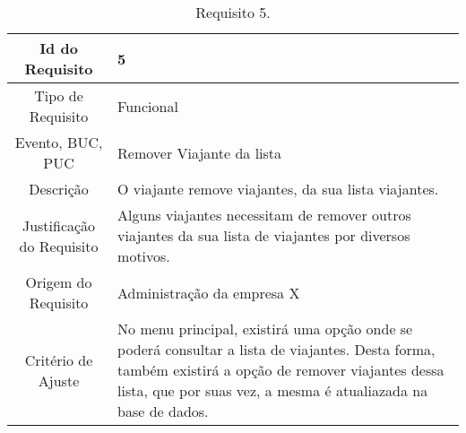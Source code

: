 \begin{table}[H]
\begin{center}
  \begin{tabularx}{\textwidth}{ | c | X | }
    \hline
    Id do Requisito & 5  \\
    
    \hline
    Tipo de Requisito & Funcional \\
    
    \hline
    Evento, BUC, PUC &  Remover Viajante da lista\\
    
    \hline
    Descrição & O viajante remove viajantes, da sua lista viajantes. \\
    
    \hline
    Justificação do Requisito & Alguns viajantes necessitam de remover outros viajantes da sua lista de viajantes por diversos motivos.  \\
    
    \hline
    Origem do Requisito & Administração da empresa X \\
    
    \hline
    Critério de Ajuste & No menu principal, existirá uma opção onde se poderá consultar a lista de viajantes. Desta forma, também existirá a opção de remover viajantes dessa lista, que por suas vez, a mesma é atualiazada na base de dados.\\
    
    \hline
  \end{tabularx}
  \caption{Requisito 5.} \label{tab:r3}
\end{center}
\end{table}


